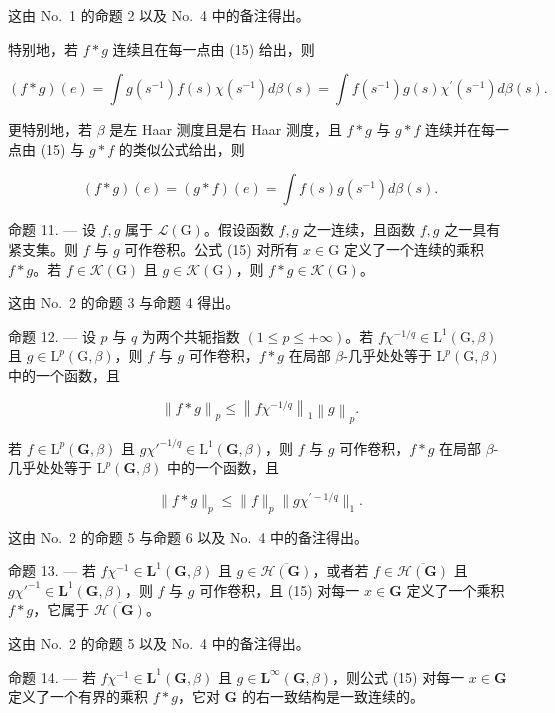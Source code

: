 这由 No.~1 的命题 2 以及 No.~4 中的备注得出。

特别地，若 \(f * g\) 连续且在每一点由 (15) 给出，则

\[
(f * g) (e) = \int g (s ^ {- 1}) f (s) \chi (s ^ {- 1}) d \beta (s) = \int f (s ^ {- 1}) g (s) \chi^ {\prime} (s ^ {- 1}) d \beta (s).\tag{16}
\]

更特别地，若 \(\beta\) 是左 Haar 测度且是右 Haar 测度，且 \(f*g\) 与 \(g*f\) 连续并在每一点由 (15) 与 \(g*f\) 的类似公式给出，则

\[
(f * g) (e) = (g * f) (e) = \int f (s) g (s ^ {- 1}) d \beta (s).\tag{17}
\]

命题 11. --- 设 \(f,g\) 属于 \(\mathcal{L}(\mathrm{G})\)。假设函数 \(f,g\) 之一连续，且函数 \(f,g\) 之一具有紧支集。则 \(f\) 与 \(g\) 可作卷积。公式 (15) 对所有 \(x\in\mathrm{G}\) 定义了一个连续的乘积 \(f*g\)。若 \(f\in\mathcal{K}(\mathrm{G})\) 且 \(g\in\mathcal{K}(\mathrm{G})\)，则 \(f*g\in\mathcal{K}(\mathrm{G})\)。

这由 No.~2 的命题 3 与命题 4 得出。

命题 12. --- 设 \(p\) 与 \(q\) 为两个共轭指数 \((1 \leqslant p \leqslant +\infty)\)。若 \(f\chi^{-1/q} \in \mathrm{L}^1(\mathrm{G}, \beta)\) 且 \(g \in \mathrm{L}^p(\mathrm{G}, \beta)\)，则 \(f\) 与 \(g\) 可作卷积，\(f * g\) 在局部 \(\beta\)-几乎处处等于 \(\mathrm{L}^p(\mathrm{G}, \beta)\) 中的一个函数，且

\[
\left\| f * g \right\| _ {p} \leqslant \left\| f \chi^ {- 1 / q} \right\| _ {1} \left\| g \right\| _ {p}.
\]

若 \(f \in \mathrm{L}^p(\mathbf{G},\beta)\) 且 \(g\chi'^{-1/q} \in \mathrm{L}^1(\mathbf{G},\beta)\)，则 \(f\) 与 \(g\) 可作卷积，\(f * g\) 在局部 \(\beta\)-几乎处处等于 \(\mathrm{L}^p(\mathbf{G},\beta)\) 中的一个函数，且

\[
\| f * g \| _ {p} \leqslant \| f \| _ {p} \| g \chi^ {\prime - 1 / q} \| _ {1}.
\]

这由 No.~2 的命题 5 与命题 6 以及 No.~4 中的备注得出。

命题 13. --- 若 \(f\chi^{-1} \in \mathbf{L}^1(\mathbf{G}, \beta)\) 且 \(g \in \overline{\mathcal{H}(\mathbf{G})}\)，或者若 \(f \in \overline{\mathcal{H}(\mathbf{G})}\) 且 \(g\chi'^{-1} \in \mathbf{L}^1(\mathbf{G}, \beta)\)，则 \(f\) 与 \(g\) 可作卷积，且 (15) 对每一 \(x \in \mathbf{G}\) 定义了一个乘积 \(f * g\)，它属于 \(\overline{\mathcal{H}(\mathbf{G})}\)。

这由 No.~2 的命题 5 以及 No.~4 中的备注得出。

命题 14. --- 若 \(f\chi^{-1} \in \mathbf{L}^1(\mathbf{G}, \beta)\) 且 \(g \in \mathbf{L}^\infty(\mathbf{G}, \beta)\)，则公式 (15) 对每一 \(x \in \mathbf{G}\) 定义了一个有界的乘积 \(f * g\)，它对 \(\mathbf{G}\) 的右一致结构是一致连续的。

